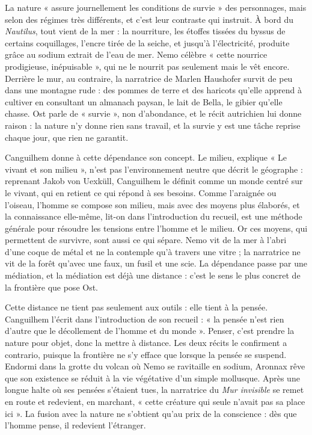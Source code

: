 \documentclass[11pt,a4paper]{article}
\begin{document}
La nature « assure journellement les conditions de survie » des personnages, mais selon des régimes très différents, et c'est leur contraste qui instruit. À bord du \emph{Nautilus}, tout vient de la mer : la nourriture, les étoffes tissées du byssus de certains coquillages, l'encre tirée de la seiche, et jusqu'à l'électricité, produite grâce au sodium extrait de l'eau de mer. Nemo célèbre « cette nourrice prodigieuse, inépuisable », qui ne le nourrit pas seulement mais le vêt encore. Derrière le mur, au contraire, la narratrice de Marlen Haushofer survit de peu dans une montagne rude : des pommes de terre et des haricots qu'elle apprend à cultiver en consultant un almanach paysan, le lait de Bella, le gibier qu'elle chasse. Ost parle de « survie », non d'abondance, et le récit autrichien lui donne raison : la nature n'y donne rien sans travail, et la survie y est une tâche reprise chaque jour, que rien ne garantit.

Canguilhem donne à cette dépendance son concept. Le milieu, explique « Le vivant et son milieu », n'est pas l'environnement neutre que décrit le géographe : reprenant Jakob von Uexküll, Canguilhem le définit comme un monde centré sur le vivant, qui en retient ce qui répond à ses besoins. Comme l'araignée ou l'oiseau, l'homme se compose son milieu, mais avec des moyens plus élaborés, et la connaissance elle-même, lit-on dans l'introduction du recueil, est une méthode générale pour résoudre les tensions entre l'homme et le milieu. Or ces moyens, qui permettent de survivre, sont aussi ce qui sépare. Nemo vit de la mer à l'abri d'une coque de métal et ne la contemple qu'à travers une vitre ; la narratrice ne vit de la forêt qu'avec une faux, un fusil et une scie. La dépendance passe par une médiation, et la médiation est déjà une distance : c'est le sens le plus concret de la frontière que pose Ost.

Cette distance ne tient pas seulement aux outils : elle tient à la pensée. Canguilhem l'écrit dans l'introduction de son recueil : « la pensée n'est rien d'autre que le décollement de l'homme et du monde ». Penser, c'est prendre la nature pour objet, donc la mettre à distance. Les deux récits le confirment a contrario, puisque la frontière ne s'y efface que lorsque la pensée se suspend. Endormi dans la grotte du volcan où Nemo se ravitaille en sodium, Aronnax rêve que son existence se réduit à la vie végétative d'un simple mollusque. Après une longue halte où ses pensées s'étaient tues, la narratrice du \emph{Mur invisible} se remet en route et redevient, en marchant, « cette créature qui seule n'avait pas sa place ici ». La fusion avec la nature ne s'obtient qu'au prix de la conscience : dès que l'homme pense, il redevient l'étranger.
\end{document}
